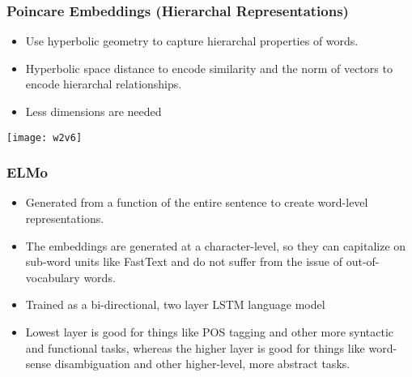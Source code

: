 \begin{frame}[fragile]\frametitle{Poincare Embeddings (Hierarchal Representations)}
  \begin{itemize}
    \item Use hyperbolic geometry to capture hierarchal properties of words. 
	\item Hyperbolic space distance to encode similarity and the norm of vectors to encode hierarchal relationships.
	\item  Less dimensions are needed
  \end{itemize}
  
 \begin{center}
\texttt{[image: w2v6]}
\end{center}
\end{frame}

\begin{frame}[fragile]\frametitle{ELMo}
  \begin{itemize}
    \item Generated from a function of the entire sentence to create word-level representations.
	\item The embeddings are generated at a character-level, so they can capitalize on sub-word units like FastText and do not suffer from the issue of out-of-vocabulary words.
	\item Trained as a bi-directional, two layer LSTM language model
	\item Lowest layer is good for things like POS tagging and other more syntactic and functional tasks, whereas the higher layer is good for things like word-sense disambiguation and other higher-level, more abstract tasks.
  \end{itemize}

\end{frame}


